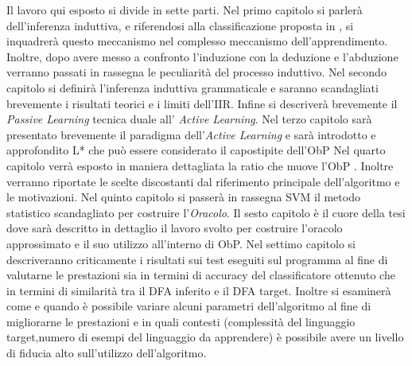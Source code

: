 Il lavoro qui esposto si divide in sette parti. Nel primo capitolo si parlerà dell'inferenza induttiva, e riferendosi alla classificazione proposta in \cite{Mic86a}, si inquadrerà questo meccanismo nel complesso meccanismo dell'apprendimento.
Inoltre, dopo avere messo a confronto l'induzione con la deduzione e l'abduzione verranno passati in rassegna le peculiarità del processo induttivo.
Nel secondo capitolo si definirà l'inferenza induttiva grammaticale e saranno scandagliati brevemente i risultati teorici e i limiti dell'\ac{IIR}. Infine si descriverà brevemente il \textit{Passive Learning} tecnica duale all' \textit{Active Learning}.
Nel terzo capitolo sarà presentato brevemente il paradigma dell'\textit{Active Learning} e sarà introdotto e approfondito L* \cite{Angluin87} che può essere considerato il capostipite dell'\ac{ObP}
Nel quarto capitolo verrà esposto in maniera dettagliata la ratio che muove l'\ac{ObP} . Inoltre verranno riportate le scelte discostanti dal riferimento principale dell'algoritmo \cite{Howar12} e le motivazioni.
Nel quinto capitolo si passerà in rassegna \ac{SVM} il metodo statistico scandagliato per costruire l'\textit{Oracolo}.
Il sesto capitolo è il cuore della tesi dove sarà descritto in dettaglio il lavoro  svolto per costruire l'oracolo approssimato e il suo utilizzo all'interno di \ac{ObP}.
Nel settimo capitolo si descriveranno criticamente i risultati sui test eseguiti sul programma al fine di valutarne le prestazioni sia in termini di accuracy del classificatore ottenuto che in termini di similarità tra il \ac{DFA} inferito e il \ac{DFA} target. Inoltre si esaminerà come e quando è possibile variare alcuni parametri dell'algoritmo al fine di migliorarne le prestazioni e in quali contesti (complessità del linguaggio target,numero di esempi del linguaggio da apprendere) è possibile avere un livello di fiducia alto sull'utilizzo dell'algoritmo. 

